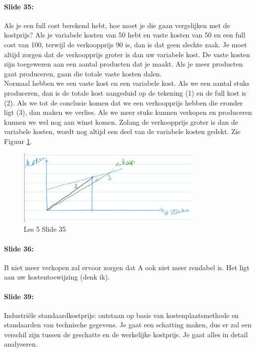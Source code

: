 \documentclass[10pt,a4paper]{report}
\begin{document}
\paragraph{Slide 35:} Als je een full cost berekend hebt, hoe moet je die gaan vergelijken met de kostprijs? Als je variabele kosten van 50 hebt en vaste kosten van 50 en een full cost van 100, terwijl de verkoopprijs 90 is, dan is dat geen slechte zaak. Je moet altijd zorgen dat de verkoopprijs groter is dan uw variabele kost. De vaste kosten zijn toegewezen aan een aantal producten dat je maakt. Als je meer producten gaat produceren, gaan die totale vaste kosten dalen.\\ Normaal hebben we een vaste kost en een variabele kost. Als we een aantal stuks produceren, dan is de totale kost aangeduid op de tekening (1) en de full kost is (2). Als we tot de conclusie komen dat we een verkoopprijs hebben die eronder ligt (3), dan maken we verlies. Als we meer stuks kunnen verkopen en produceren kunnen we wel nog aan winst komen. Zolang de verkoopprijs groter is dan de variabele kosten, wordt nog altijd een deel van de variabele kosten gedekt. Zie Figuur \ref{les05_09}.

\begin{figure}[h!]
\centering
\includegraphics[width=90mm]{Les05_09.png}
\caption{Les 5 Slide 35} 
\label{les05_09}
\end{figure}

\paragraph{Slide 36:} B niet meer verkopen zal ervoor zorgen dat A ook niet meer rendabel is. Het ligt aan uw kostentoewijzing (denk ik).

\paragraph{Slide 39:} Industri\"ele standaardkostprijs: ontstaan op basis van kostenplaatsmethode en standaarden van technische gegevens. Je gaat een schatting maken, dus er zal een verschil zijn tussen de geschatte en de werkelijke kostprijs. Je gaat alles in detail analyseren. 
\end{document}

